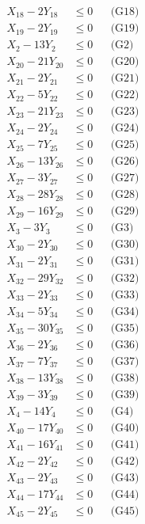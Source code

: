 \documentclass[a4paper,10pt]{article}
\begin{document}
{\begin{align}
X_{18} - 2Y_{18} &\leq 0 && \text{(G18)} \\
X_{19} - 2Y_{19} &\leq 0 && \text{(G19)} \\
X_{2} - 13Y_{2} &\leq 0 && \text{(G2)} \\
X_{20} - 21Y_{20} &\leq 0 && \text{(G20)} \\
X_{21} - 2Y_{21} &\leq 0 && \text{(G21)} \\
X_{22} - 5Y_{22} &\leq 0 && \text{(G22)} \\
X_{23} - 21Y_{23} &\leq 0 && \text{(G23)} \\
X_{24} - 2Y_{24} &\leq 0 && \text{(G24)} \\
X_{25} - 7Y_{25} &\leq 0 && \text{(G25)} \\
X_{26} - 13Y_{26} &\leq 0 && \text{(G26)} \\
\allowbreak
X_{27} - 3Y_{27} &\leq 0 && \text{(G27)} \\
X_{28} - 28Y_{28} &\leq 0 && \text{(G28)} \\
X_{29} - 16Y_{29} &\leq 0 && \text{(G29)} \\
X_{3} - 3Y_{3} &\leq 0 && \text{(G3)} \\
X_{30} - 2Y_{30} &\leq 0 && \text{(G30)} \\
X_{31} - 2Y_{31} &\leq 0 && \text{(G31)} \\
X_{32} - 29Y_{32} &\leq 0 && \text{(G32)} \\
X_{33} - 2Y_{33} &\leq 0 && \text{(G33)} \\
X_{34} - 5Y_{34} &\leq 0 && \text{(G34)} \\
X_{35} - 30Y_{35} &\leq 0 && \text{(G35)} \\
X_{36} - 2Y_{36} &\leq 0 && \text{(G36)} \\
X_{37} - 7Y_{37} &\leq 0 && \text{(G37)} \\
X_{38} - 13Y_{38} &\leq 0 && \text{(G38)} \\
X_{39} - 3Y_{39} &\leq 0 && \text{(G39)} \\
X_{4} - 14Y_{4} &\leq 0 && \text{(G4)} \\
X_{40} - 17Y_{40} &\leq 0 && \text{(G40)} \\
X_{41} - 16Y_{41} &\leq 0 && \text{(G41)} \\
X_{42} - 2Y_{42} &\leq 0 && \text{(G42)} \\
X_{43} - 2Y_{43} &\leq 0 && \text{(G43)} \\
X_{44} - 17Y_{44} &\leq 0 && \text{(G44)} \\
\allowbreak
X_{45} - 2Y_{45} &\leq 0 && \text{(G45)} \\

\end{align}}
\end{document}
